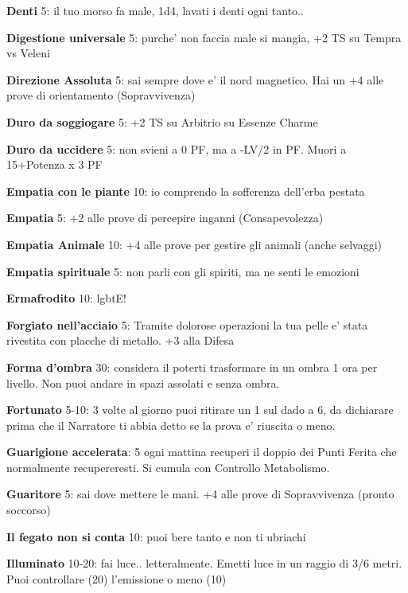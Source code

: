 \documentclass[a4paper,11pt,twoside,openany]{dndbook}
\begin{document}
\textbf{Denti} 5: il tuo morso fa male, 1d4, lavati i denti ogni tanto..

\textbf{Digestione universale} 5: purche' non faccia male si mangia, +2 TS su Tempra vs Veleni

\textbf{Direzione Assoluta} 5: sai sempre dove e' il nord magnetico. Hai un +4 alle prove di orientamento (Sopravvivenza)

\textbf{Duro da soggiogare} 5: +2 TS su Arbitrio su Essenze Charme

\textbf{Duro da uccidere} 5: non svieni a 0 PF, ma a -LV/2 in PF. Muori a 15+Potenza x 3 PF

\textbf{Empatia con le piante} 10: io comprendo la sofferenza dell'erba pestata

\textbf{Empatia} 5: +2 alle prove di percepire inganni (Consapevolezza)

\textbf{Empatia Animale} 10: +4 alle prove per gestire gli animali (anche selvaggi)

\textbf{Empatia spirituale} 5: non parli con gli spiriti, ma ne senti le emozioni

\textbf{Ermafrodito} 10: lgbtE!

\textbf{Forgiato nell'acciaio} 5: Tramite dolorose operazioni la tua pelle e' stata rivestita con placche di metallo. +3 alla Difesa

\textbf{Forma d'ombra} 30: considera il poterti trasformare in un ombra 1 ora per livello. Non puoi andare in spazi assolati e senza ombra.

\textbf{Fortunato} 5-10: 3 volte al giorno puoi ritirare un 1 sul dado a 6, da dichiarare prima che il Narratore ti abbia detto se la prova e' riuscita o meno.

\textbf{Guarigione accelerata}: 5 ogni mattina recuperi il doppio dei Punti Ferita che normalmente recupereresti. Si cumula con Controllo Metabolismo. 

\textbf{Guaritore} 5: sai dove mettere le mani. +4 alle prove di Sopravvivenza (pronto soccorso)

\textbf{Il fegato non si conta} 10: puoi bere tanto e non ti ubriachi

\textbf{Illuminato} 10-20: fai luce.. letteralmente. Emetti luce in un raggio di 3/6 metri. Puoi controllare (20) l'emissione o meno (10)
\end{document}
